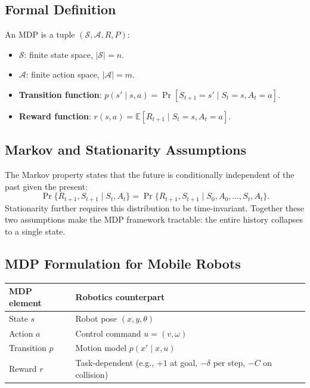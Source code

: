\documentclass[11pt,a4paper]{article}
\theoremstyle{definition}
\theoremstyle{plain}
\theoremstyle{remark}
\begin{document}
\subsection{Formal Definition}

An MDP is a tuple $(\mathcal{S}, \mathcal{A}, R, P)$:
\begin{itemize}
    \item $\mathcal{S}$: finite state space, $|\mathcal{S}| = n$.
    \item $\mathcal{A}$: finite action space, $|\mathcal{A}| = m$.
    \item \textbf{Transition function}: $p(s' \mid s, a) = \Pr[S_{t+1} = s' \mid S_t = s, A_t = a]$.
    \item \textbf{Reward function}: $r(s, a) = \mathbb{E}[R_{t+1} \mid S_t = s, A_t = a]$.
\end{itemize}

\subsection{Markov and Stationarity Assumptions}

The Markov property states that the future is conditionally independent of the past given the present:
\[
    \Pr\{R_{t+1}, S_{t+1} \mid S_t, A_t\} = \Pr\{R_{t+1}, S_{t+1} \mid S_0, A_0, \ldots, S_t, A_t\}.
\]
Stationarity further requires this distribution to be time-invariant. Together these two assumptions make the MDP framework tractable: the entire history collapses to a single state.

\subsection{MDP Formulation for Mobile Robots}

\begin{center}
\begin{tabular}{ll}
\hline
\textbf{MDP element} & \textbf{Robotics counterpart} \\
\hline
State $s$         & Robot pose $(x, y, \theta)$ \\
Action $a$        & Control command $u = (v, \omega)$ \\
Transition $p$    & Motion model $p(x' \mid x, u)$ \\
Reward $r$        & Task-dependent (e.g., $+1$ at goal, $-\delta$ per step, $-C$ on collision) \\
\hline
\end{tabular}
\end{center}
\end{document}
